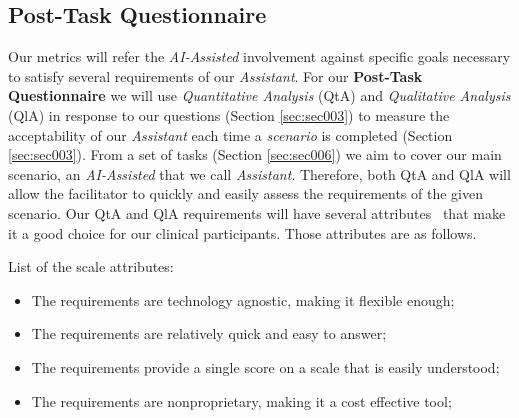 

\subsection{Post-Task Questionnaire}

Our metrics will refer the \textit{AI-Assisted} involvement against specific goals necessary to satisfy several requirements of our \textit{Assistant}. For our \textbf{Post-Task Questionnaire} we will use \textit{Quantitative Analysis} (QtA) and \textit{Qualitative Analysis} (QlA) in response to our questions (Section \ref{sec:sec003}) to measure the acceptability of our \textit{Assistant} each time a \textit{scenario} is completed (Section \ref{sec:sec003}). From a set of tasks (Section \ref{sec:sec006}) we aim to cover our main scenario, an \textit{AI-Assisted} that we call \textit{Assistant}. Therefore, both QtA and QlA will allow the facilitator to quickly and easily assess the requirements of the given scenario. Our QtA and QlA requirements will have several attributes~\cite{joyce2017healthcare} that make it a good choice for our clinical participants. Those attributes are as follows.

\hfill


List of the scale attributes:


\hfill

\begin{itemize}
  \item The requirements are technology agnostic, making it flexible enough;
  \item The requirements are relatively quick and easy to answer;
  \item The requirements provide a single score on a scale that is easily understood;
  \item The requirements are nonproprietary, making it a cost effective tool;
\end{itemize}

\hfill


